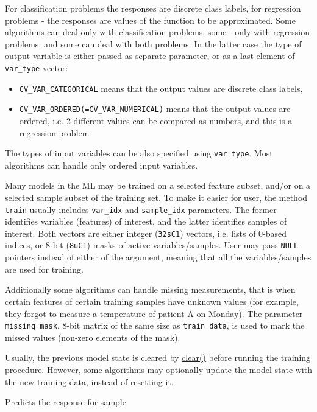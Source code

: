 For classification problems the responses are discrete class labels, for regression problems - the responses are values of the function to be approximated. Some algorithms can deal only with classification problems, some - only with regression problems, and some can deal with both problems. In the latter case the type of output variable is either passed as separate parameter, or as a last element of \texttt{var\_type} vector:
\begin{itemize}
 \item \texttt{CV\_VAR\_CATEGORICAL} means that the output values are discrete class labels,
 \item \texttt{CV\_VAR\_ORDERED(=CV\_VAR\_NUMERICAL)} means that the output values are ordered, i.e. 2 different values can be compared as numbers, and this is a regression problem
\end{itemize}
The types of input variables can be also specified using \texttt{var\_type}. Most algorithms can handle only ordered input variables.

Many models in the ML may be trained on a selected feature subset, and/or on a selected sample subset of the training set. To make it easier for user, the method \texttt{train} usually includes \texttt{var\_idx} and \texttt{sample\_idx} parameters. The former identifies variables (features) of interest, and the latter identifies samples of interest. Both vectors are either integer (\texttt{32sC1}) vectors, i.e. lists of 0-based indices, or 8-bit (\texttt{8uC1}) masks of active variables/samples. User may pass \texttt{NULL} pointers instead of either of the argument, meaning that all the variables/samples are used for training.

Additionally some algorithms can handle missing measurements, that is when certain features of certain training samples have unknown values (for example, they forgot to measure a temperature of patient A on Monday). The parameter \texttt{missing\_mask}, 8-bit matrix of the same size as \texttt{train\_data}, is used to mark the missed values (non-zero elements of the mask).

Usually, the previous model state is cleared by \href{#CvStatModel_clear}{clear()} before running the training procedure. However, some algorithms may optionally update the model state with the new training data, instead of resetting it.



Predicts the response for sample


